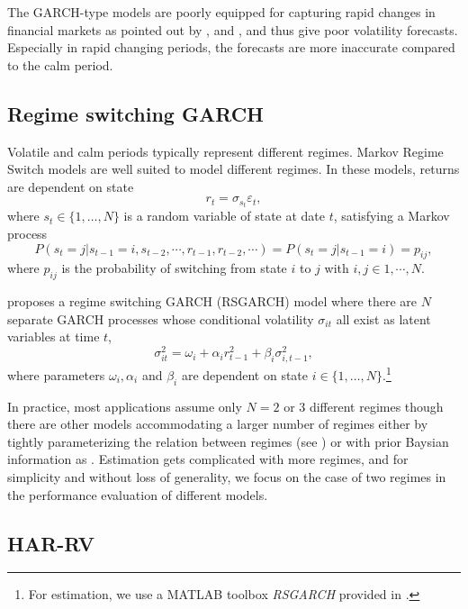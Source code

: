\documentclass[preprint,12pt,authoryear]{elsarticle}
\begin{document}
The GARCH-type models are poorly equipped for capturing rapid changes in financial markets as pointed out by \cite{Andersen2003}, \cite{Hansen2012} and \cite{Smetanina2021}, and thus give poor volatility forecasts. Especially in rapid changing periods, the forecasts are more inaccurate compared to the calm period.

\subsection{Regime switching GARCH}

Volatile and calm periods typically represent different regimes. Markov Regime Switch models are well suited to model different regimes.
In these models, returns are dependent on state
\begin{equation}
	r_t=\sigma_{s_t}\varepsilon_t,
\end{equation}
where $s_t\in \{1,\dots,N\}$ is a random variable of state at date $t$, satisfying a Markov process
\begin{equation}
	P(s_t=j|s_{t-1}=i,s_{t-2},\cdots,r_{t-1},r_{t-2},\cdots)=P(s_t=j|s_{t-1}=i)=p_{ij},
\end{equation}
where $p_{ij}$ is the probability of switching from state $i$ to $j$ with $i,j\in 1,\cdots,N$.

\cite{Haas2004} proposes a regime switching GARCH (RSGARCH) model where there are $N$ separate GARCH processes whose conditional volatility $\sigma_{it}$ all exist as latent variables at time $t$,
\begin{equation}
	\sigma_{it}^2=\omega_i+\alpha_i r_{t-1}^2+\beta_i \sigma_{i,t-1}^2,
\end{equation}
where parameters $\omega_i, \alpha_i$ and $\beta_i$ are dependent on state $i\in \{1,\dots,N\}$.\footnote{For estimation, we use a MATLAB toolbox \textit{RSGARCH} provided in \cite{Chuffart2017}.}

In practice, most applications assume only $N=2$ or $3$ different regimes though there are other models accommodating a larger number of regimes either by tightly parameterizing the relation between regimes (see \cite{Calvet2004}) or with prior Baysian information as \cite{Sims2006}. Estimation gets complicated with more regimes, and for simplicity and without loss of generality, we focus on the case of two regimes in the performance evaluation of different models.

\subsection{HAR-RV}
\end{document}
